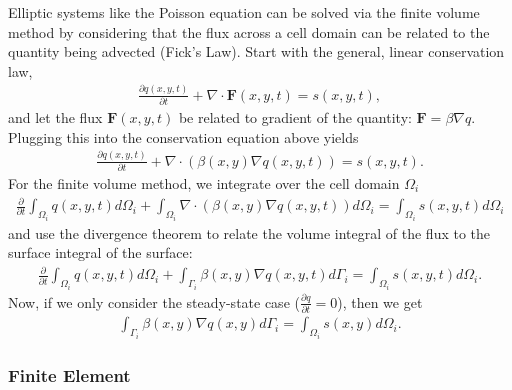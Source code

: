 Elliptic systems like the Poisson equation can be solved via the finite volume method by considering that the flux across a cell domain can be related to the quantity being advected (Fick's Law). Start with the general, linear conservation law,
\begin{align}
    \frac{\partial q(x,y,t)}{\partial t} + \nabla \cdot \textbf{F}(x,y,t) = s(x,y,t),
\end{align}
and let the flux $\textbf{F}(x,y,t)$ be related to gradient of the quantity: $\textbf{F} = \beta \nabla q$. Plugging this into the conservation equation above yields
\begin{align}
    \frac{\partial q(x,y,t)}{\partial t} + \nabla \cdot \left( \beta(x,y) \nabla q(x,y,t) \right) = s(x,y,t).
\end{align}
For the finite volume method, we integrate over the cell domain $\Omega_i$
\begin{align}
    \frac{\partial}{\partial t} \int_{\Omega_i} q(x,y,t) d\Omega_i + \int_{\Omega_i} \nabla \cdot \left( \beta(x,y) \nabla q(x,y,t) \right) d\Omega_i = \int_{\Omega_i} s(x,y,t) d\Omega_i
\end{align}
and use the divergence theorem to relate the volume integral of the flux to the surface integral of the surface:
\begin{align}
    \frac{\partial}{\partial t} \int_{\Omega_i} q(x,y,t) d\Omega_i + \int_{\Gamma_i} \beta(x,y) \nabla q(x,y,t) d\Gamma_i = \int_{\Omega_i} s(x,y,t) d\Omega_i.
\end{align}
Now, if we only consider the steady-state case ($\frac{\partial q}{\partial t} = 0$), then we get
\begin{align}
    \int_{\Gamma_i} \beta(x,y) \nabla q(x,y) d\Gamma_i = \int_{\Omega_i} s(x,y) d\Omega_i.
\end{align}


\subsubsection{Finite Element}

